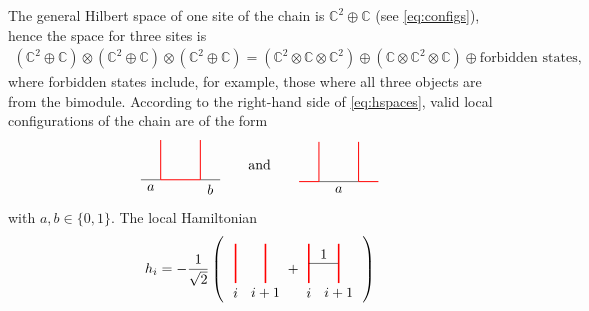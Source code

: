 The general Hilbert space of one site of the chain is $\mathbb{C}^2\oplus \mathbb{C}$ (see \eqref{eq:configs}), hence the space for three sites is
	\begin{align}\label{eq:hspaces}
		(\mathbb{C}^2\oplus \mathbb{C})\otimes(\mathbb{C}^2\oplus \mathbb{C})\otimes(\mathbb{C}^2\oplus \mathbb{C})=(\mathbb{C}^2\otimes\mathbb{C}\otimes\mathbb{C}^2)\oplus(\mathbb{C}\otimes\mathbb{C}^2\otimes\mathbb{C})\oplus\textrm{forbidden states},
	\end{align}
where forbidden states include, for example, those where all three objects are from the bimodule.
According to the right-hand side of \eqref{eq:hspaces}, valid local configurations of the chain are of the form
	\begin{equation*}
		\begin{tikzpicture}[scale=1,baseline=(current bounding box.center)]
			\draw (-0.5,0) to node [below] {$a$} (0,0);
			\draw [red, line width=0.25mm] (0,0) -- (1,0);
			\draw (1,0) to node [below] {$b$} (1.5,0);
			\draw [red, line width=0.25mm] (0,0) -- (0,1);
			\draw [red, line width=0.25mm] (1,0) -- (1,1);
		\end{tikzpicture} \hspace{20pt}\text{and}\hspace{20pt}
		\begin{tikzpicture}[scale=1,baseline=(current bounding box.center)]
			\draw [red, line width=0.25mm] (-0.5,0) -- (0,0);
			\draw (0,0) to node [below] {$a$} (1,0);
			\draw [red, line width=0.25mm] (1,0) -- (1.5,0);
			\draw [red, line width=0.25mm] (0,0) -- (0,1);
			\draw [red, line width=0.25mm] (1,0) -- (1,1);
		\end{tikzpicture}
	\end{equation*}
\noindent
with $a,b\in\{0,1\}$. The local Hamiltonian 
	\begin{equation}
		h_i = -\frac{1}{\sqrt{2}}\left(\ 
		\begin{tikzpicture}[scale=0.5,baseline=(current bounding box.center)]
		\draw[red,line width=0.4mm] (0,0) -- (0,2);
		\draw[red,line width=0.4mm] (1.5,0) -- (1.5,2);
		\node at (0,-0.5) {$i$};
		\node at (1.5,-0.5) {$i+1$};
		\end{tikzpicture}+
		\begin{tikzpicture}[scale=0.5,baseline=(current bounding box.center)]
		\draw[red,line width=0.4mm] (0,0) -- (0,2);
		\draw (0,1) to node[above] {$1$} (1.5,1);
		\draw[red,line width=0.4mm] (1.5,0) -- (1.5,2);
		\node at (0,-0.5) {$i$};
		\node at (1.5,-0.5) {$i+1$};
		\end{tikzpicture}\ \right)
	\end{equation}
